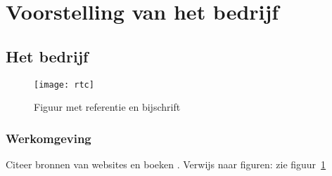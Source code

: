 
\section{Voorstelling van het bedrijf} %
\label{sec:Voorstelling}

\subsection{Het bedrijf} %
\label{sub:bedrijf}

\lipsum[1]

\begin{figure}[H]
  \label{figure:webrtc}
  \centering
  \texttt{[image: rtc]}
  \caption{Figuur met referentie en bijschrift \cite{voorbeeld-ref}}
\end{figure}

\subsubsection{Werkomgeving}

Citeer bronnen van websites \cite{voorbeeld-ref} en boeken \cite{boek-ref}. Verwijs naar figuren: zie figuur~\ref{figure:webrtc}

\lipsum[1]

